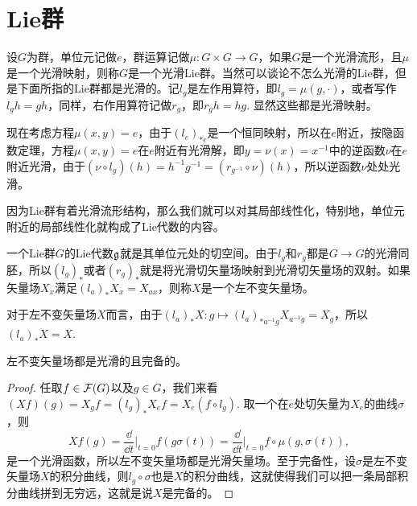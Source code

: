 \section{Lie群}


\begin{para}[Lie群]
设$G$为群，单位元记做$e$，群运算记做$\mu:G\times G\to G$，如果$G$是一个光滑流形，且$\mu$是一个光滑映射，则称$G$是一个光滑Lie群。当然可以谈论不怎么光滑的Lie群，但是下面所指的Lie群都是光滑的。记$l_g$是左作用算符，即$l_g=\mu(g,\cdot)$，或者写作$l_gh=gh$，同样，右作用算符记做$r_g$，即$r_gh=hg$. 显然这些都是光滑映射。

现在考虑方程$\mu(x,y)=e$，由于$(l_e)_{*e}$是一个恒同映射，所以在$e$附近，按隐函数定理，方程$\mu(x,y)=e$在$e$附近有光滑解，即$y=\nu(x)=x^{-1}$中的逆函数$\nu$在$e$附近光滑，由于$(\nu\circ l_g)(h)=h^{-1}g^{-1}=(r_{g^{-1}}\circ \nu)(h)$，所以逆函数$\nu$处处光滑。
\end{para}

因为Lie群有着光滑流形结构，那么我们就可以对其局部线性化，特别地，单位元附近的局部线性化就构成了Lie代数的内容。

\begin{para}[Lie代数与左不变矢量场]
一个Lie群$G$的Lie代数${\mathfrak{g}}$就是其单位元处的切空间。由于$l_g$和$r_g$都是$G\to G$的光滑同胚，所以$(l_g)_*$或者$(r_g)_*$就是将光滑切矢量场映射到光滑切矢量场的双射。如果矢量场$X_x$满足$(l_a)_*X_x=X_{ax}$，则称$X$是一个左不变矢量场。

对于左不变矢量场$X$而言，由于$(l_a)_*X:g\mapsto (l_a)_{*a^{-1}g}X_{a^{-1}g}=X_g$，所以$(l_a)_*X=X$.
\end{para}

\begin{lem}
左不变矢量场都是光滑的且完备的。
\end{lem}

\begin{proof}
任取$f\in\mathcal{F}(G)$以及$g\in G$，我们来看$(Xf)(g)=X_gf=(l_g)_{*}X_ef=X_e(f\circ l_g)$. 取一个在$e$处切矢量为$X_e$的曲线$\sigma$，则
\[
	Xf(g)=\frac{\dd }{\dd t}\bigg|_{t=0}f(g\sigma(t))=\frac{\dd }{\dd t}\bigg|_{t=0}f\circ \mu(g,\sigma(t)),
\]
是一个光滑函数，所以左不变矢量场都是光滑矢量场。至于完备性，设$\sigma$是左不变矢量场$X$的积分曲线，则$l_g\circ \sigma$也是$X$的积分曲线，这就使得我们可以把一条局部积分曲线拼到无穷远，这就是说$X$是完备的。
\end{proof}

